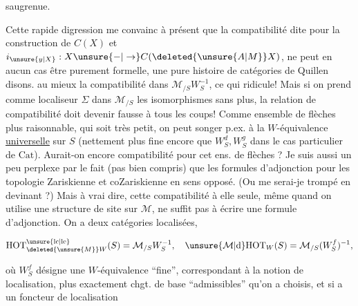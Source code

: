 
saugrenue.

Cette rapide digression me convainc à présent que la compatibilité dite pour la construction de $C(X)$ et $i_{\unsure{y|X}}:X\unsure{-|\to}C(\deleted{\unsure{A|M}}X)$, ne peut en aucun cas être purement formelle, une pure histoire de catégories de Quillen disons.    au mieux la compatibilité dans $\mathcal M_{/S}W_S^{-1}$, ce qui  ridicule!  Mais si on prend comme localiseur $\Sigma$ dans $\mathcal M_{/S}$ les isomorphismes sans plus, la relation de compatibilité doit devenir fausse à tous les coups! Comme ensemble de flèches  plus raisonnable, qui soit  très petit, on peut songer p.ex. à la $W$-équivalence \uline{universelle} sur $S$ (nettement plus fine encore que $W_S^d,W_S^g$ dans le cas particulier de $\mathrm{Cat}$). Aurait-on encore compatibilité pour cet ens. de flèches ? Je suis aussi un peu perplexe par le fait (pas bien compris) que les formules d'adjonction pour les topologie Zariskienne et coZariskienne  en sens opposé. (Ou me serai-je trompé en devinant  ?) Mais à vrai dire, cette compatibilité à elle seule, même quand on utilise une structure de site sur $\mathcal M$, ne suffit pas à écrire une formule d'adjonction. On a deux catégories localisées,

\[
\mathrm{HOT}^{\unsure{\mathrm{lc}|\mathrm{le}}}_{\deleted{\unsure{M}}W}(S)=\mathcal M_{/S}W_S^{-1},\quad
\unsure{\mathcal M|\mathrm{d}}\mathrm{HOT}_{W}(S)=\mathcal M_{/S}(W_S^f)^{-1},
\]

où $W_S^f$ désigne une $W$-équivalence ``fine'', correspondant à la notion de localisation, plus exactement  chgt. de base ``admissibles'' qu'on a choisis, et si  a un foncteur de localisation
